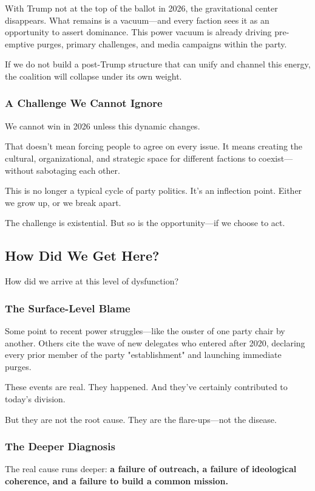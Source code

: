 With Trump not at the top of the ballot in 2026, the gravitational center disappears. What remains is a vacuum—and every faction sees it as an opportunity to assert dominance. This power vacuum is already driving pre-emptive purges, primary challenges, and media campaigns within the party.

If we do not build a post-Trump structure that can unify and channel this energy, the coalition will collapse under its own weight.

\subsubsection{A Challenge We Cannot Ignore}
We cannot win in 2026 unless this dynamic changes.

That doesn’t mean forcing people to agree on every issue. It means creating the cultural, organizational, and strategic space for different factions to coexist—without sabotaging each other.

This is no longer a typical cycle of party politics. It’s an inflection point. Either we grow up, or we break apart.

The challenge is existential. But so is the opportunity—if we choose to act.

\subsection{How Did We Get Here?}

How did we arrive at this level of dysfunction?

\subsubsection{The Surface-Level Blame}
Some point to recent power struggles—like the ouster of one party chair by another. Others cite the wave of new delegates who entered after 2020, declaring every prior member of the party "establishment" and launching immediate purges.

These events are real. They happened. And they’ve certainly contributed to today’s division.

But they are not the root cause. They are the flare-ups—not the disease.

\subsubsection{The Deeper Diagnosis}
The real cause runs deeper: \textbf{a failure of outreach, a failure of ideological coherence, and a failure to build a common mission.}

